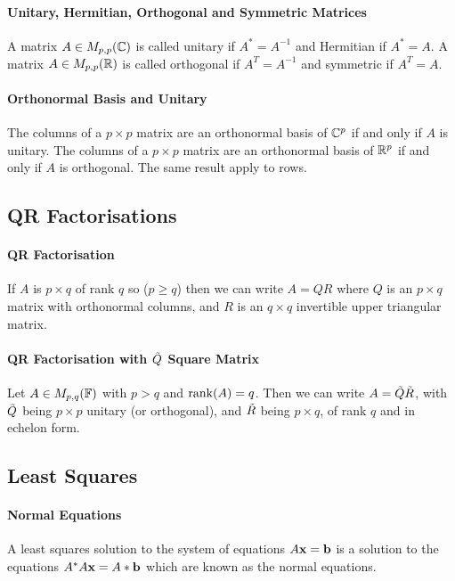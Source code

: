 \paragraph{Unitary, Hermitian, Orthogonal and Symmetric Matrices}
A matrix \(A \in M_{p,p}(\mathbb{C})\) is called unitary if \(A^* = A^{-1}\) and Hermitian if \(A^* = A\). A matrix \(A \in M_{p,p}(\mathbb{R})\) is called orthogonal if \(A^T = A^{-1}\) and symmetric if \(A^T = A\).

\paragraph{Orthonormal Basis and Unitary}
The columns of a \(p \times p\) matrix are an orthonormal basis of \(\mathbb{C}^p\) if and only if \(A\) is unitary. The columns of a \(p \times p\) matrix are an orthonormal basis of \(\mathbb{R}^p\) if and only if \(A\) is orthogonal. The same result apply to rows.

\subsection{QR Factorisations}
\paragraph{QR Factorisation}
If \(A\) is \(p \times q\) of rank \(q\) so (\(p \geq q\)) then we can write \(A = QR\) where \(Q\) is an \(p \times q\) matrix with orthonormal columns, and \(R\) is an \(q \times q\) invertible upper triangular matrix.

\paragraph{QR Factorisation with \(\Tilde{Q}\) Square Matrix}
Let \(A \in M_{p,q}(\mathbb{F})\) with \(p > q\) and \(\rank(A) = q\). Then we can write \(A = \Tilde{Q}\Tilde{R}\), with \(\Tilde{Q}\) being \(p \times p\) unitary (or orthogonal), and \(\Tilde{R}\) being \(p \times q\), of rank \(q\) and in echelon form.

\subsection{Least Squares}
\paragraph{Normal Equations}
A least squares solution to the system of equations \(A\mathbf{x} = \mathbf{b}\) is a solution to the equations \(A^* A\mathbf{x} = A*\mathbf{b}\) which are known as the normal equations.